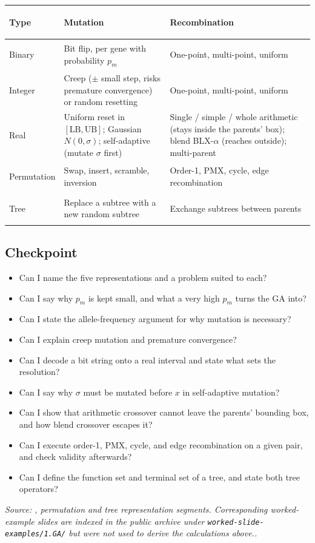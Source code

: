 \documentclass[11pt,a4paper]{article}
\newcommand{\source}[1]{\par\smallskip\noindent\textit{Source: #1.}\par\smallskip}
\begin{document}
\begin{tabular}{@{}>{\bfseries\raggedright\arraybackslash}p{}
  >{\raggedright\arraybackslash}p{}
  >{\raggedright\arraybackslash}p{}@{}}
\toprule
Type & Mutation & Recombination\\
\midrule
Binary & Bit flip, per gene with probability $p_m$ & One-point, multi-point, uniform\\
Integer & Creep ($\pm$ small step, risks premature convergence) or random resetting & One-point, multi-point, uniform\\
Real & Uniform reset in $[\mathrm{LB},\mathrm{UB}]$; Gaussian $N(0,\sigma)$; self-adaptive (mutate $\sigma$ first) & Single / simple / whole arithmetic (stays inside the parents' box); blend BLX-$\alpha$ (reaches outside); multi-parent\\
Permutation & Swap, insert, scramble, inversion & Order-1, PMX, cycle, edge re\-com\-bi\-na\-tion\\
Tree & Replace a subtree with a new random subtree & Exchange subtrees between parents\\
\bottomrule
\end{tabular}

\subsection{Checkpoint}
\begin{itemize}
\item Can I name the five representations and a problem suited to each?
\item Can I say why $p_m$ is kept small, and what a very high $p_m$ turns the GA into?
\item Can I state the allele-frequency argument for why mutation is necessary?
\item Can I explain creep mutation and premature convergence?
\item Can I decode a bit string onto a real interval and state what sets the resolution?
\item Can I say why $\sigma$ must be mutated before $x$ in self-adaptive mutation?
\item Can I show that arithmetic crossover cannot leave the parents' bounding box, and how blend crossover escapes it?
\item Can I execute order-1, PMX, cycle, and edge recombination on a given pair, and check validity afterwards?
\item Can I define the function set and terminal set of a tree, and state both tree operators?
\end{itemize}
\source{, permutation and tree
representation segments. Corresponding worked-example slides are indexed in
the public archive under \texttt{worked-slide-examples/1.GA/} but were not
used to derive the calculations above.}
\end{document}
